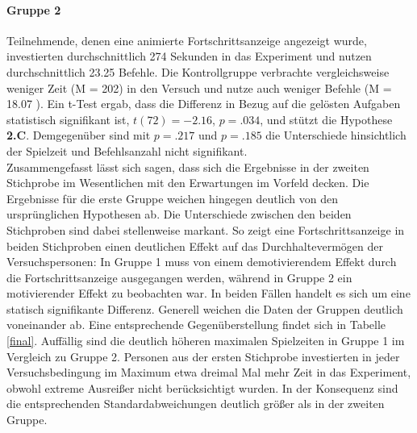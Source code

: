 \paragraph{Gruppe 2}
Teilnehmende, denen eine animierte Fortschrittsanzeige angezeigt wurde, investierten durchschnittlich 274 Sekunden in das Experiment und nutzen durchschnittlich 23.25 Befehle. Die Kontrollgruppe verbrachte vergleichsweise weniger Zeit (M = 202) in den Versuch und nutze auch weniger Befehle (M = 18.07 ). Ein t-Test ergab, dass die Differenz in Bezug auf die gelösten Aufgaben statistisch signifikant ist, $t(72) = -2.16$, $p=.034$, und stützt die Hypothese \textbf{2.C}. Demgegenüber sind mit $p = .217$ und $p = .185$ die Unterschiede hinsichtlich der Spielzeit und Befehlsanzahl nicht signifikant.\\
 
Zusammengefasst lässt sich sagen, dass sich die Ergebnisse in der zweiten Stichprobe im Wesentlichen mit den Erwartungen im Vorfeld decken. Die Ergebnisse für die erste Gruppe weichen hingegen deutlich von den ursprünglichen Hypothesen ab. Die Unterschiede zwischen den beiden Stichproben sind dabei stellenweise markant. So zeigt eine Fortschrittsanzeige in beiden Stichproben einen deutlichen Effekt auf das Durchhaltevermögen der Versuchspersonen: In Gruppe 1 muss von einem demotivierendem Effekt durch die Fortschrittsanzeige ausgegangen werden, während in Gruppe 2 ein motivierender Effekt zu beobachten war. In beiden Fällen handelt es sich um eine statisch signifikante Differenz. Generell weichen die Daten der Gruppen deutlich voneinander ab. Eine entsprechende Gegenüberstellung findet sich in Tabelle \ref{final}. Auffällig sind die deutlich höheren maximalen Spielzeiten in Gruppe 1 im Vergleich zu Gruppe 2. Personen aus der ersten Stichprobe investierten in jeder Versuchsbedingung im Maximum etwa dreimal Mal mehr Zeit in das Experiment, obwohl extreme Ausreißer nicht berücksichtigt wurden. In der Konsequenz sind die entsprechenden Standardabweichungen deutlich größer als in der zweiten Gruppe.


